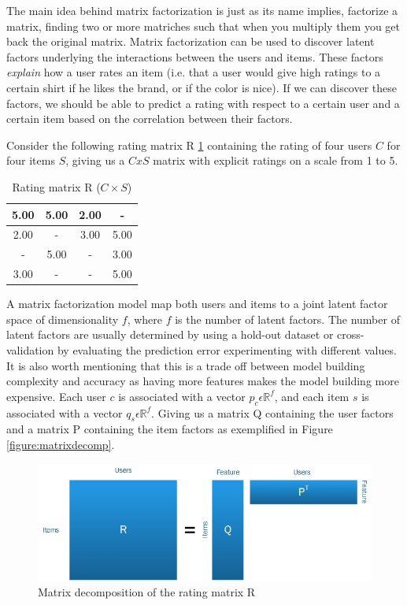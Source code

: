 The main idea behind matrix factorization is just as its name implies, factorize a matrix, finding two or more matriches such that when you multiply them you get back the original matrix. Matrix factorization can be used to discover latent factors underlying the interactions between the users and items. These factors \emph{explain} how a user rates an item (i.e. that a user would give high ratings to a certain shirt if he likes the brand, or if the color is nice). If we can discover these factors, we should be able to predict a rating with respect to a certain user and a certain item based on the correlation between their factors.

Consider the following rating matrix R \ref{table:RatingMatrix} containing the rating of four users $C$ for four items $S$, giving us a $CxS$ matrix with explicit ratings on a scale from 1 to 5.

\begin{table}[!htbp]
\centering
\begin{tabular}{|c|c|c|c|}
\hline
5.00 	& 5.00	& 2.00 & - 	  \\ \hline
2.00 	& -		& 3.00 & 5.00 \\ \hline
 - 		& 5.00	& -    & 3.00 \\ \hline
3.00	& - 	& -	   & 5.00 \\ \hline
\end{tabular}
\label{table:RatingMatrix}
\caption{Rating matrix R ($C \times S$)}
\end{table}

A matrix factorization model map both users and items to a joint latent factor space of dimensionality $f$, where $f$ is the number of latent factors. The number of latent factors are usually determined by using a hold-out dataset or cross-validation by evaluating the prediction error experimenting with different values. It is also worth mentioning that this is a trade off between model building complexity and accuracy as having more features makes the model building more expensive. Each user $c$ is associated with a vector $p_{c} \epsilon \mathbb{R}^{f}$, and each item $s$ is associated with a vector $q_{s} \epsilon \mathbb{R}^{f}$. Giving us a matrix Q containing the user factors and a matrix P containing the item factors as exemplified in Figure \ref{figure:matrixdecomp}.

\begin{figure}[H]
    \includegraphics[width=5in]{image/matrixdecomp.jpg}
    \centering
    \caption[Matrix decomposition of the rating matrix R]{Matrix decomposition of the rating matrix R}
    \label{figure:ratingmatrix}
\end{figure}

